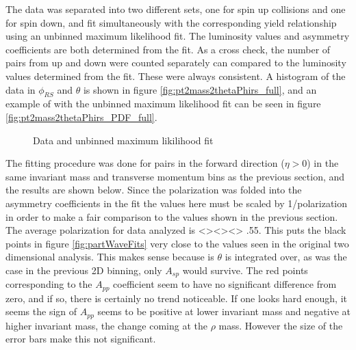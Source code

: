 \documentclass[abstract = on,listof=totoc, bibliography=totoc]{scrreprt}
\newcommand{\phirs}{\phi_{RS}}
\begin{document}
The data was separated into two different sets, one for spin up collisions and one for spin down, and fit simultaneously with the corresponding yield relationship using an unbinned maximum likelihood fit. The luminosity values and asymmetry coefficients are both determined from the fit. As a cross check, the number of pairs from up and down were counted separately can compared to the luminosity values determined from the fit. These were always consistent. A histogram of the data in $\phirs$ and $\theta$ is shown in figure \ref{fig:pt2mass2thetaPhirs_full}, and an example of with the unbinned maximum likelihood fit can be seen in figure \ref{fig:pt2mass2thetaPhirs_PDF_full}.
\begin{figure}[!tbp]
  \centering
  \hfill
  \caption{Data and unbinned maximum likilihood fit}
\end{figure}

The fitting procedure was done for pairs in the forward direction ($\eta > 0$) in the same invariant mass and transverse momentum bins as the previous section, and the results are shown below. Since the polarization was folded into the asymmetry coefficients in the fit the values here must be scaled by 1/polarization in order to make a fair comparison to the values shown in the previous section. The average polarization for data analyzed is <><><> .55. This puts the black points in figure \ref{fig:partWaveFits} very close to the values seen in the original two dimensional analysis. This makes sense because is $\theta$ is integrated over, as was the case in the previous 2D binning, only $A_{sp}$ would survive. The red points corresponding to the $A_{pp}$ coefficient seem to have no significant difference from zero, and if so, there is certainly no trend noticeable. If one looks hard enough, it seems the sign of $A_{pp}$ seems to be positive at lower invariant mass and negative at higher invariant mass, the change coming at the $\rho$ mass. However the size of the error bars make this not significant. 
\end{document}
